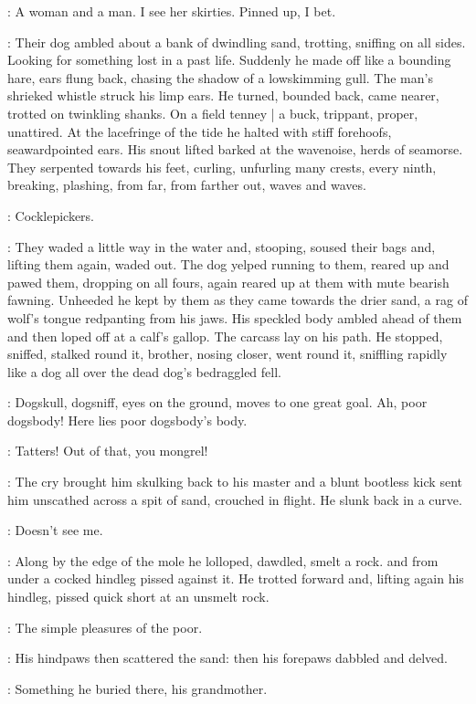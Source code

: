 \StephenInt:
A woman and a man.
I see her skirties.
Pinned up, I bet.

:
Their dog ambled about a bank of dwindling sand,
trotting, sniffing on all sides.
Looking for something lost in a past life.
Suddenly he made off like a bounding hare,
ears flung back, chasing the shadow of a lowskimming gull.
The man's shrieked whistle struck his limp ears.
He turned, bounded back, came nearer, trotted on twinkling shanks.
On a field tenney |
a buck, trippant, proper, unattired.
At the lacefringe of the tide
he halted with stiff forehoofs, seawardpointed ears.
His snout lifted
barked at the wavenoise, herds of seamorse.
They serpented towards his feet,
curling, unfurling many crests,
every ninth,
breaking, plashing,
from far,
from farther out,
waves and waves.

\StephenInt:
Cocklepickers.

:
They waded a little way in the water and, stooping,
soused their bags and, lifting them again, waded out.
The dog yelped
running to them,
reared up and pawed them,
dropping on all fours,
again reared up at them with mute bearish fawning.
Unheeded
he kept by them
as they came towards the drier sand,
a rag of wolf's tongue redpanting from his jaws.
His speckled body ambled ahead of them
and then loped off at a calf's gallop.
The carcass lay on his path.
He stopped, sniffed, stalked round it,
brother, nosing closer, went round it,
sniffling rapidly like a dog
all over the dead dog's bedraggled fell.

\StephenInt:
Dogskull, dogsniff,
eyes on the ground,
moves to one great goal.
Ah, poor dogsbody!
Here lies poor dogsbody's body.

\man:
Tatters!
Out of that, you mongrel!

:
The cry brought him skulking back to his master
and a blunt bootless kick sent him unscathed
across a spit of sand, crouched in flight.
He slunk back in a curve.

\StephenInt:
Doesn't see me.

:
Along by the edge of the mole
he lolloped, dawdled, smelt a rock.
and from under a cocked hindleg
pissed against it.
He trotted forward and, lifting again his hindleg,
pissed quick short at an unsmelt rock.

\StephenInt:
The simple pleasures of the poor.

:
His hindpaws then scattered the sand:
then his forepaws dabbled and delved.

\StephenInt:
Something he buried there, his grandmother.

